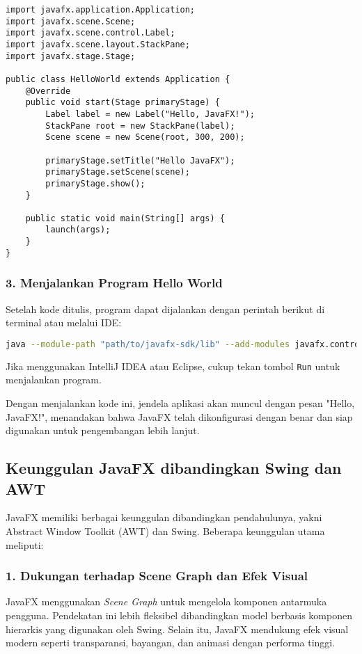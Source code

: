 \begin{lstlisting}[style=JavaStyle, caption=Program Hello World menggunakan JavaFX]
import javafx.application.Application;
import javafx.scene.Scene;
import javafx.scene.control.Label;
import javafx.scene.layout.StackPane;
import javafx.stage.Stage;

public class HelloWorld extends Application {
	@Override
	public void start(Stage primaryStage) {
		Label label = new Label("Hello, JavaFX!");
		StackPane root = new StackPane(label);
		Scene scene = new Scene(root, 300, 200);
		
		primaryStage.setTitle("Hello JavaFX");
		primaryStage.setScene(scene);
		primaryStage.show();
	}
	
	public static void main(String[] args) {
		launch(args);
	}
}
\end{lstlisting}

\subsubsection{3. Menjalankan Program Hello World}

Setelah kode ditulis, program dapat dijalankan dengan perintah berikut di terminal atau melalui IDE:

\begin{lstlisting}[language=bash, caption=Menjalankan program Hello World]
java --module-path "path/to/javafx-sdk/lib" --add-modules javafx.controls,javafx.fxml -jar HelloWorld.jar
\end{lstlisting}

Jika menggunakan IntelliJ IDEA atau Eclipse, cukup tekan tombol \texttt{Run} untuk menjalankan program.

Dengan menjalankan kode ini, jendela aplikasi akan muncul dengan pesan "Hello, JavaFX!", menandakan bahwa JavaFX telah dikonfigurasi dengan benar dan siap digunakan untuk pengembangan lebih lanjut.


\subsection{Keunggulan JavaFX dibandingkan Swing dan AWT}

JavaFX memiliki berbagai keunggulan dibandingkan pendahulunya, yakni Abstract Window Toolkit (AWT) dan Swing. Beberapa keunggulan utama meliputi:

\subsubsection{1. Dukungan terhadap Scene Graph dan Efek Visual}
JavaFX menggunakan \textit{Scene Graph} untuk mengelola komponen antarmuka pengguna. Pendekatan ini lebih fleksibel dibandingkan model berbasis komponen hierarkis yang digunakan oleh Swing. Selain itu, JavaFX mendukung efek visual modern seperti transparansi, bayangan, dan animasi dengan performa tinggi.

